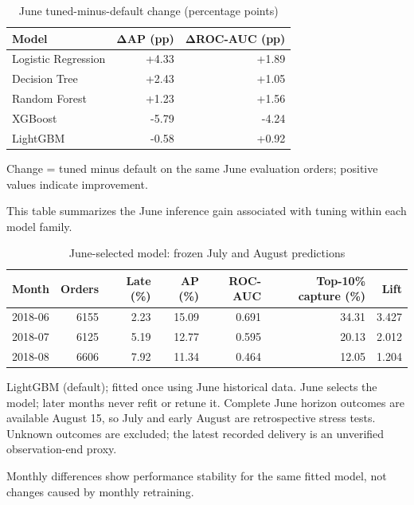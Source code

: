 \begin{table}[htbp]
\centering
\small
\caption{June tuned-minus-default change (percentage points)}
\begin{tabular}{lrr}
\toprule
Model & ΔAP (pp) & ΔROC-AUC (pp) \\
\midrule
Logistic Regression & +4.33 & +1.89 \\
Decision Tree & +2.43 & +1.05 \\
Random Forest & +1.23 & +1.56 \\
XGBoost & -5.79 & -4.24 \\
LightGBM & -0.58 & +0.92 \\
\bottomrule
\end{tabular}
\par\smallskip\begin{minipage}{\linewidth}\footnotesize Change = tuned minus default on the same June evaluation orders; positive values indicate improvement.\end{minipage}
\end{table}
This table summarizes the June inference gain associated with tuning within each model family.

\begin{table}[htbp]
\centering
\small
\caption{June-selected model: frozen July and August predictions}
\begin{tabular}{lrrrrrr}
\toprule
Month & Orders & Late (\%) & AP (\%) & ROC-AUC & Top-10\% capture (\%) & Lift \\
\midrule
2018-06 & 6155 & 2.23 & 15.09 & 0.691 & 34.31 & 3.427 \\
2018-07 & 6125 & 5.19 & 12.77 & 0.595 & 20.13 & 2.012 \\
2018-08 & 6606 & 7.92 & 11.34 & 0.464 & 12.05 & 1.204 \\
\bottomrule
\end{tabular}
\par\smallskip\begin{minipage}{\linewidth}\footnotesize LightGBM (default); fitted once using June historical data. June selects the model; later months never refit or retune it. Complete June horizon outcomes are available August 15, so July and early August are retrospective stress tests. Unknown outcomes are excluded; the latest recorded delivery is an unverified observation-end proxy.\end{minipage}
\end{table}
Monthly differences show performance stability for the same fitted model, not changes caused by monthly retraining.

